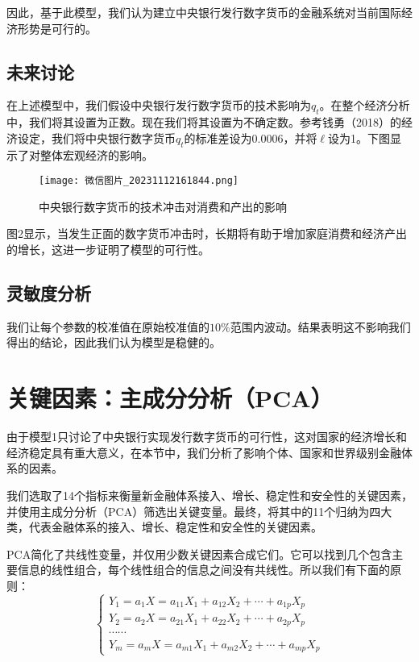 \documentclass[withoutpreface,bwprint]{cumcmthesis} %
\begin{document}
因此，基于此模型，我们认为建立中央银行发行数字货币的金融系统对当前国际经济形势是可行的。

\subsection{未来讨论}
在上述模型中，我们假设中央银行发行数字货币的技术影响为$q_t$。在整个经济分析中，我们将其设置为正数。现在我们将其设置为不确定数。参考钱勇（2018）\cite{qian2018experimental}的经济设定，我们将中央银行数字货币$q_t$的标准差设为0.0006，并将$\ell$设为1。下图显示了对整体宏观经济的影响。

\begin{figure}[htbp]  %
	\centering  %
	\texttt{[image: 微信图片\_20231112161844.png]} %
	\caption{中央银行数字货币的技术冲击对消费和产出的影响} %
\end{figure}
\vspace{-0.8cm}

图2显示，当发生正面的数字货币冲击时，长期将有助于增加家庭消费和经济产出的增长，这进一步证明了模型的可行性。

\subsection{灵敏度分析}
我们让每个参数的校准值在原始校准值的$10\%$范围内波动。结果表明这不影响我们得出的结论，因此我们认为模型是稳健的。

\section{关键因素：主成分分析（PCA）}
由于模型1只讨论了中央银行实现发行数字货币的可行性，这对国家的经济增长和经济稳定具有重大意义，在本节中，我们分析了影响个体、国家和世界级别金融体系的因素。

我们选取了14个指标来衡量新金融体系接入、增长、稳定性和安全性的关键因素，并使用主成分分析（PCA）筛选出关键变量。最终，将其中的11个归纳为四大类，代表金融体系的接入、增长、稳定性和安全性的关键因素。

PCA简化了共线性变量，并仅用少数关键因素合成它们。它可以找到几个包含主要信息的线性组合，每个线性组合的信息之间没有共线性。所以我们有下面的原则：
\begin{equation}
	\left\{\begin{array}{c}
		Y_1=a_1 X=a_{11} X_1+a_{12} X_2+\cdots+a_{1 p} X_p \\
		Y_2=a_2 X=a_{21} X_1+a_{22} X_2+\cdots+a_{2 p} X_p \\
		\cdots \cdots \\
		Y_m=a_m X=a_{m 1} X_1+a_{m 2} X_2+\cdots+a_{m p} X_p
	\end{array}\right.
\end{equation}
\end{document}
